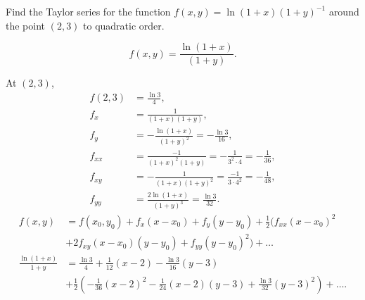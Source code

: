 \documentclass[10pt, a4paper]{article}
\begin{document}
\begin{problem}
    Find the Taylor series for the function $f(x, y) = \ln(1 + x)(1 + y) ^ {-1}$ around the point $(2, 3)$ to quadratic order.

    \begin{solution}
        \[
        f(x, y) = \frac{\ln(1 + x)}{(1 + y)}.
        \]

        At $(2, 3)$,
        \begin{align*}
            f(2, 3) &= \frac{\ln{3}}{4}, \\
            f_x &= \frac{1}{(1 + x)(1 + y)}, \\
            f_y &= -\frac{\ln(1 + x)}{(1 + y) ^ 2} = -\frac{\ln{3}}{16}, \\
            f_{xx} &= \frac{-1}{(1 + x) ^ 2(1 + y)} = -\frac{1}{3 ^ 2 \cdot 4} = -\frac{1}{36}, \\
            f_{xy} &= -\frac{1}{(1 + x)(1 + y) ^ 2} = \frac{-1}{3 \cdot 4 ^ 2} = -\frac{1}{48}, \\
            f_{yy} &= \frac{2\ln(1 + x)}{(1 + y) ^ 3} = \frac{\ln{3}}{32}.
        \end{align*}
        \begin{align*}
            f(x, y) &= f(x_0, y_0) + f_x(x - x_0) + f_y(y - y_0) + \frac{1}{2}(f_{xx}(x - x_0) ^ 2 \\
            &+ 2f_{xy}(x - x_0)(y - y_0) + f_{yy}(y - y_0) ^ 2) + \dotsc \\
            \frac{\ln(1 + x)}{1 + y} &= \frac{\ln{3}}{4} + \frac{1}{12}(x - 2) - \frac{\ln{3}}{16}(y - 3) \\
            &+ \frac{1}{2}\left(-\frac{1}{36}(x - 2) ^ 2 - \frac{1}{24}(x - 2)(y - 3) + \frac{\ln{3}}{32}(y - 3) ^ 2\right) + \dotsc.
        \end{align*}
    \end{solution}
\end{problem}
\end{document}
